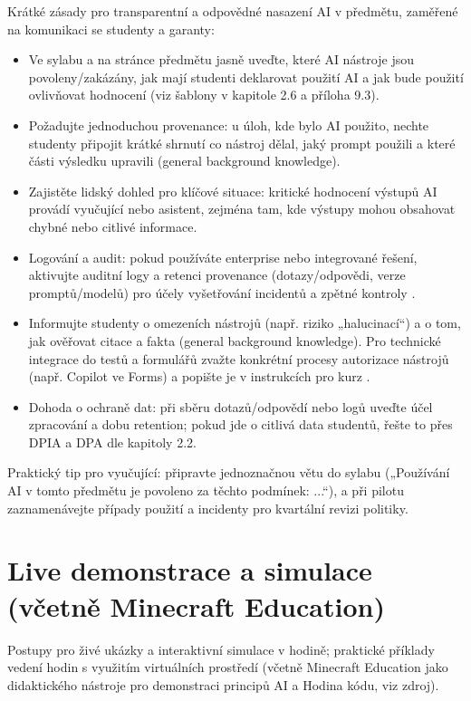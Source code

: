 \documentclass{report}%
\begin{document}
%
Krátké zásady pro transparentní a odpovědné nasazení AI v předmětu, zaměřené na komunikaci se studenty a garanty:

\begin{itemize}
  \item Ve sylabu a na stránce předmětu jasně uveďte, které AI nástroje jsou povoleny/zakázány, jak mají studenti deklarovat použití AI a jak bude použití ovlivňovat hodnocení (viz šablony v kapitole 2.6 a příloha 9.3). %
  \item Požadujte jednoduchou provenance: u úloh, kde bylo AI použito, nechte studenty připojit krátké shrnutí co nástroj dělal, jaký prompt použili a které části výsledku upravili (general background knowledge).
  \item Zajistěte lidský dohled pro klíčové situace: kritické hodnocení výstupů AI provádí vyučující nebo asistent, zejména tam, kde výstupy mohou obsahovat chybné nebo citlivé informace.
  \item Logování a audit: pokud používáte enterprise nebo integrované řešení, aktivujte auditní logy a retenci provenance (dotazy/odpovědi, verze promptů/modelů) pro účely vyšetřování incidentů a zpětné kontroly \cite{kb_ai_101_tipu_pdf_04e4a115_page_3_1}.
  \item Informujte studenty o omezeních nástrojů (např. riziko „halucinací“) a o tom, jak ověřovat citace a fakta (general background knowledge). Pro technické integrace do testů a formulářů zvažte konkrétní procesy autorizace nástrojů (např. Copilot ve Forms) a popište je v instrukcích pro kurz \cite{kb_ai_101_tipu_pdf_04e4a115_page_36_1}.
  \item Dohoda o ochraně dat: při sběru dotazů/odpovědí nebo logů uveďte účel zpracování a dobu retention; pokud jde o citlivá data studentů, řešte to přes DPIA a DPA dle kapitoly 2.2. %
\end{itemize}

Praktický tip pro vyučující: připravte jednoznačnou větu do sylabu („Používání AI v tomto předmětu je povoleno za těchto podmínek: ...“), a při pilotu zaznamenávejte případy použití a incidenty pro kvartální revizi politiky.%

%
\section{Live demonstrace a simulace (včetně Minecraft Education)}%
Postupy pro živé ukázky a interaktivní simulace v hodině; praktické příklady vedení hodin s využitím virtuálních prostředí (včetně Minecraft Education jako didaktického nástroje pro demonstraci principů AI a Hodina kódu, viz zdroj).%
\end{document}
